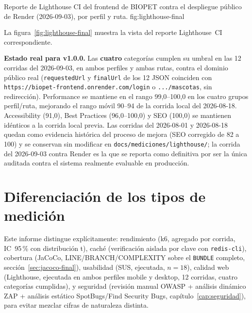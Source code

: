 %
{Reporte de Lighthouse CI del frontend de BIOPET contra el despliegue p\'ublico de Render (2026-09-03), por perfil y ruta.}%
{fig:lighthouse-final}

La figura~\ref{fig:lighthouse-final} muestra la vista del reporte
Lighthouse~CI correspondiente.

\textbf{Estado real para v1.0.0.} Las \textbf{cuatro} categor\'ias cumplen
su umbral en las 12 corridas del 2026-09-03, en ambos perfiles y ambas
rutas, contra el dominio p\'ublico real (\texttt{requestedUrl} y
\texttt{finalUrl} de los 12 JSON coinciden con
\texttt{https://biopet-frontend.onrender.com/login} o
\texttt{.../mascotas}, sin redirecci\'on). Performance se mantiene en el
rango 99{,}0--100{,}0 en los cuatro grupos perfil/ruta, mejorando el rango
m\'ovil 90--94 de la corrida local del 2026-08-18. Accessibility (91{,}0),
Best Practices (96{,}0--100{,}0) y SEO (100{,}0) se mantienen id\'enticos a
la corrida local previa. Las corridas del 2026-08-01 y 2026-08-18 quedan
como evidencia hist\'orica del proceso de mejora (SEO corregido de 82 a
100) y se conservan sin modificar en
\texttt{docs/mediciones/lighthouse/}; la corrida del 2026-09-03 contra
Render es la que se reporta como definitiva por ser la \'unica auditada
contra el sistema realmente evaluable en producci\'on.

\section{Diferenciaci\'on de los tipos de medici\'on}

Este informe distingue expl\'icitamente: rendimiento (k6, agregado por
corrida, IC~95\,\% con distribuci\'on t), cach\'e (verificaci\'on aislada
por clave con \texttt{redis-cli}), cobertura (JaCoCo, LINE/BRANCH/COMPLEXITY
sobre el \texttt{BUNDLE} completo, secci\'on~\ref{sec:jacoco-final}), usabilidad (SUS, ejecutada, $n=18$),
calidad web (Lighthouse, ejecutada en ambos perfiles mobile y desktop, 12
corridas, cuatro categor\'ias cumplidas), y seguridad (revisi\'on manual OWASP +
an\'alisis din\'amico ZAP + an\'alisis est\'atico SpotBugs/Find Security
Bugs, cap\'itulo~\ref{cap:seguridad}), para evitar mezclar cifras de
naturaleza distinta.
